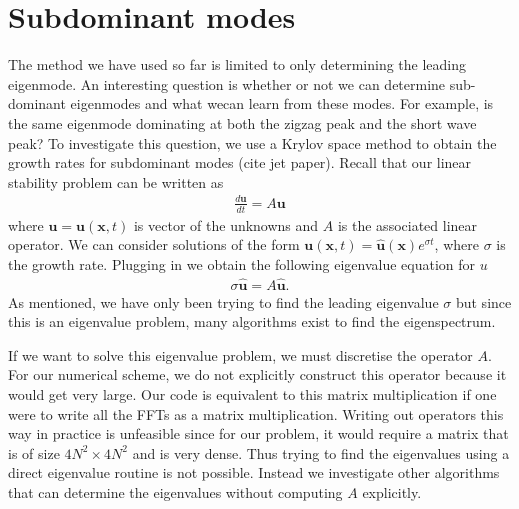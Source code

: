 \section{Subdominant modes}
The method we have used so far is limited to only determining the leading eigenmode. An interesting question is whether or not we can determine sub-dominant eigenmodes and what wecan learn from these modes. For example, is the same eigenmode dominating at both the zigzag peak and the short wave peak? To investigate this question, we use a Krylov space method to obtain the growth rates for subdominant modes (cite jet paper). Recall that our linear stability problem can be written as 
\begin{align}
\frac{d\bm{u}}{dt} = A\bm{u}
\end{align}
where $\bm{u}=\bm{u}(\bm{x},t)$ is vector of the unknowns and $A$ is the associated linear operator. We can consider solutions of the form $\bm{u}(\bm{x},t)=\hat{\bm{u}}(\bm{x})e^{\sigma t}$, where $\sigma$ is the growth rate. Plugging in we obtain the following eigenvalue equation for $u$
\begin{align}
\sigma \hat{\bm{u}} = A\hat{\bm{u}}.
\end{align}
As mentioned, we have only been trying to find the leading eigenvalue $\sigma$ but since this is an eigenvalue problem, many algorithms exist to find the eigenspectrum. 

If we want to solve this eigenvalue problem, we must discretise the operator $A$. For our numerical scheme, we do not explicitly construct this operator because it would get very large. Our code is equivalent to this matrix multiplication if one were to write all the FFTs as a matrix multiplication. Writing out operators this way in practice is unfeasible since for our problem, it would require a matrix that is of size $4N^{2}\times 4N^{2}$ and is very dense. Thus trying to find the eigenvalues using a direct eigenvalue routine is not possible. Instead we investigate other algorithms that can determine the eigenvalues without computing $A$ explicitly. 

